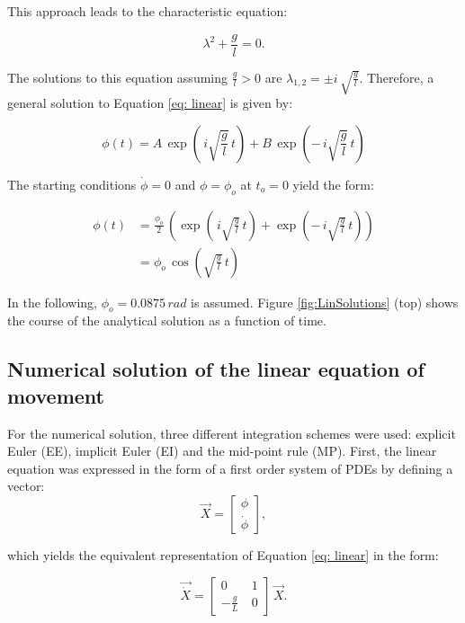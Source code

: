 \documentclass[12pt,bibstyle=none,pagenumberinfooter]{ifmdocument}
\begin{document}
This approach leads to the characteristic equation:

\begin{equation}
    \lambda^2 + \frac{g}{l} = 0.
\end{equation}

The solutions to this equation assuming $\frac{g}{l}>0$ are $\lambda_{1,2} = \pm i\,\sqrt{\frac{g}{l}}$. Therefore, a general solution to Equation \ref{eq: linear} is given by:

\begin{equation}
    \phi (t) = A\,\exp{\left(\,i\sqrt{\frac{g}{l}}\,t\right)} + B\, \exp{\left(-\,i\sqrt{\frac{g}{l}}\,t\right)}
\end{equation}

The starting conditions $\Dot{\phi} = 0$ and $\phi = \phi_o$ at $t_o = 0$ yield the form:

\begin{align}
    \phi(t)
    & = \frac{\phi_o}{2}\, \left(\exp{\left(\,i\sqrt{\frac{g}{l}}\,t\right)} + \exp{\left(-\,i\sqrt{\frac{g}{l}}\,t\right)} \right) \\
    & = \phi_o\,\cos{\left(\sqrt{\frac{g}{l}}\,t \right)}
\end{align}

In the following, $\phi_o = 0.0875\,rad$ is assumed. Figure \ref{fig:LinSolutions} (top) shows the course of the analytical solution as a function of time.


\subsection{Numerical solution of the linear equation of movement}

For the numerical solution, three different integration schemes were used: explicit Euler (EE), implicit Euler (EI) and the mid-point rule (MP). First, the linear equation was expressed in the form of a first order system of PDEs by defining a vector:
\begin{equation}
    \Vec{X} = \begin{bmatrix}
        \phi \\ \Dot{\phi} 
        \end{bmatrix},
\end{equation}

which yields the equivalent representation of Equation \ref{eq: linear} in the form:

\begin{equation}
    \Vec{\Dot{X}} = \begin{bmatrix}
        0 & 1 \\ -\frac{g}{L}\ & 0 
        \end{bmatrix} \, \Vec{X}.
        \label{eq: firstOrderSysLin}
\end{equation}
\end{document}

